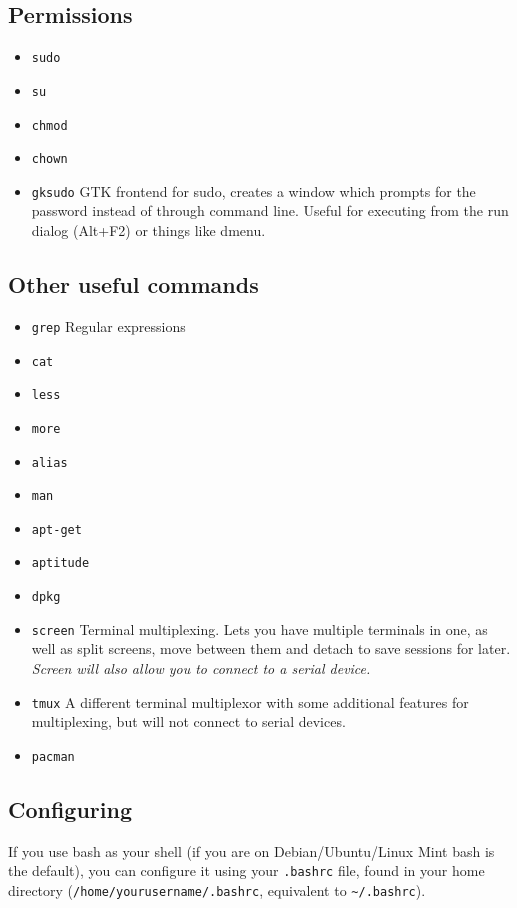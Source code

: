 \documentclass[12pt]{book}
\begin{document}
			\subsection{Permissions}
				\begin{itemize}
					\item \verb+sudo+
					\item \verb+su+
					\item \verb+chmod+
					\item \verb+chown+
					\item \verb+gksudo+ GTK frontend for sudo, creates a window which prompts for the password instead of through command line.  Useful for executing from the run dialog (Alt+F2) or things like dmenu.
				\end{itemize}
			\subsection{Other useful commands}
				\begin{itemize}
					\item \verb+grep+ Regular expressions
					\item \verb+cat+
					\item \verb+less+
					\item \verb+more+
					\item \verb+alias+
					\item \verb+man+
					\item \verb+apt-get+
					\item \verb+aptitude+
					\item \verb+dpkg+
					\item \verb+screen+ Terminal multiplexing.  Lets you have multiple terminals in one, as well as split screens, move between them and detach to save sessions for later.  \emph{Screen will also allow you to connect to a serial device.}
					\item \verb+tmux+ A different terminal multiplexor with some additional features for multiplexing, but will not connect to serial devices.
					\item \verb+pacman+
				\end{itemize}
			
			\subsection{Configuring}
				If you use bash as your shell (if you are on Debian/Ubuntu/Linux Mint bash is the default), you can configure it using your \verb+.bashrc+ file, found in your home directory (\verb+/home/yourusername/.bashrc+, equivalent to \verb+~/.bashrc+).
				
\end{document}

